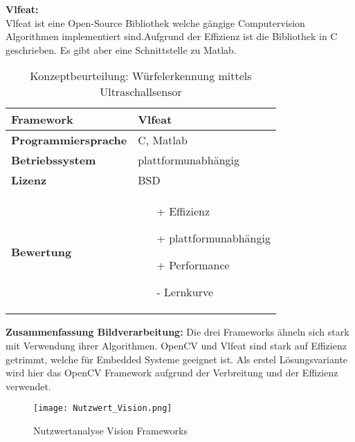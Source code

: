 \documentclass[../../main.tex]{subfiles}
\begin{document}
        \textbf{Vlfeat: }\\
        Vlfeat ist eine Open-Source Bibliothek welche gängige Computervision Algorithmen implementiert sind.Aufgrund der Effizienz ist die Bibliothek in C geschrieben. Es gibt aber eine Schnittstelle zu Matlab. 
        \begin{flushleft}
            \begin{table}[h]
            \begin{tabular}{ | l | p{11cm} |}
            \hline
            \textbf{Framework} & Vlfeat \\ \hline
            \textbf{Programmiersprache} & C, Matlab \\ \hline
            \textbf{Betriebssystem} & plattformunabhängig \\ \hline
            \textbf{Lizenz} & BSD \\ \hline
            \textbf{Bewertung} &  \begin{itemize}
                                    \item[+] Effizienz
                                    \item[+] plattformunabhängig 
                                    \item[+] Performance
                                    \item[-] Lernkurve 
                                  \end{itemize} \\ \hline
            \end{tabular}
            \caption{Konzeptbeurteilung: Würfelerkennung mittels Ultraschallsensor}
            \label{tab:konzept_wurfel_ultraschall}
            \end{table}
        \end{flushleft}

        \textbf{Zusammenfassung Bildverarbeitung: }
        Die drei Frameworks ähneln sich stark mit Verwendung ihrer Algorithmen. OpenCV und Vlfeat sind stark auf Effizienz getrimmt, welche für Embedded Systeme geeignet ist. Als erstel Lösungsvariante wird hier das OpenCV Framework aufgrund der Verbreitung und der Effizienz verwendet.

        \begin{figure}[H] 
            \centering
            \texttt{[image: Nutzwert\_Vision.png]}
            \caption{Nutzwertanalyse Vision Frameworks}
            \label{fig:vision_nutzwert}
        \end{figure}
\end{document}

